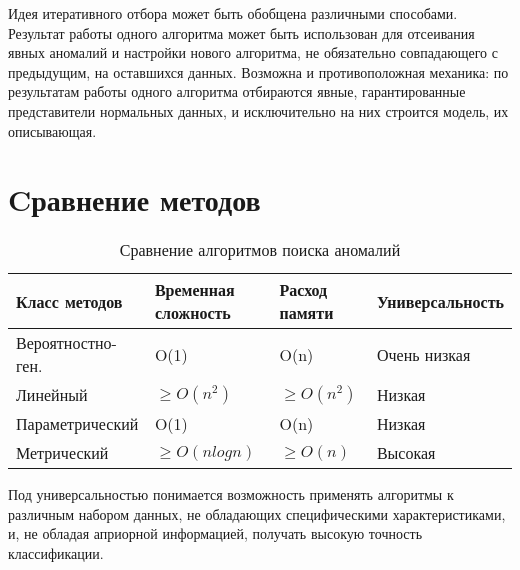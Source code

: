 Идея итеративного отбора может быть обобщена различными способами. Результат работы одного алгоритма может быть использован для отсеивания явных аномалий и настройки нового алгоритма, не обязательно совпадающего с предыдущим, на оставшихся данных. Возможна и противоположная механика: по результатам работы одного алгоритма отбираются явные, гарантированные
представители нормальных данных, и исключительно на них строится модель, их описывающая.
\section*{Cравнение методов}

\begin{table*}[!h]
	
	\caption{\label{tab:collectdata}Сравнение алгоритмов поиска аномалий}
	
	\begin{center}
		
		\begin{tabular}{|l|l|l|l|}
			
			\hline
			
			Класс методов & Временная сложность & Расход памяти & Универсальность \\
			
			\hline \hline
			
			Вероятностно-ген.& O(1) &  O(n) & Очень низкая \\
			
			
			\hline
			
			Линейный &  $\ge O(n^2)$ &  $\ge O(n^2)$ & Низкая\\
			
			
			\hline
			Параметрический & O(1) & O(n) & Низкая\\
			\hline
			Метрический & $\ge O(nlogn)$ & $\ge O(n)$ & Высокая\\
			
			
			\hline
			
			
		\end{tabular}
		
	\end{center}
	
\end{table*}                               
Под универсальностью понимается возможность применять алгоритмы к различным набором данных, не обладающих специфическими характеристиками, и, не обладая априорной информацией, получать высокую точность классификации.

